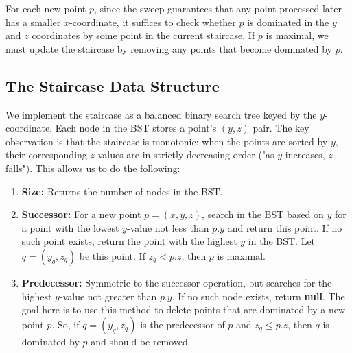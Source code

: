 \documentclass[a4paper]{article}
\begin{document}
\noindent For each new point $p$, since the sweep guarantees that any point processed later has a smaller $x$-coordinate, it suffices to check whether $p$ is dominated in the $y$ and $z$ coordinates by some point in the current staircase. If $p$ is maximal, we must update the staircase by removing any points that become dominated by $p$.

\subsection*{The Staircase Data Structure}
We implement the staircase as a balanced binary search tree keyed by the $y$-coordinate. Each node in the BST stores a point's $(y,z)$ pair. The key observation is that the staircase is monotonic: when the points are sorted by $y$, their corresponding $z$ values are in strictly decreasing order ("as $y$ increases, $z$ falls"). This allows us to do the following:

\begin{enumerate}[label=(\alph*)]
    \item \textbf{Size:} Returns the number of nodes in the BST.

    \item \textbf{Successor:} For a new point $p=(x,y,z)$, search in the BST based on $y$ for a point with the lowest $y$-value not less than $p.y$ and return this point. If no such point exists, return the point with the highest $y$ in the BST. Let $q=(y_q, z_q)$ be this point. If $z_q < p.z$, then $p$ is maximal.
    
    \item \textbf{Predecessor:} Symmetric to the successor operation, but searches for the highest $y$-value not greater than $p.y$. If no such node exists, return \textbf{null}. The goal here is to use this method to delete points that are dominated by a new point $p$. So, if $q=(y_q, z_q)$ is the predecessor of $p$ and $z_q \leq p.z$, then $q$ is dominated by $p$ and should be removed.

\end{enumerate}
\end{document}
